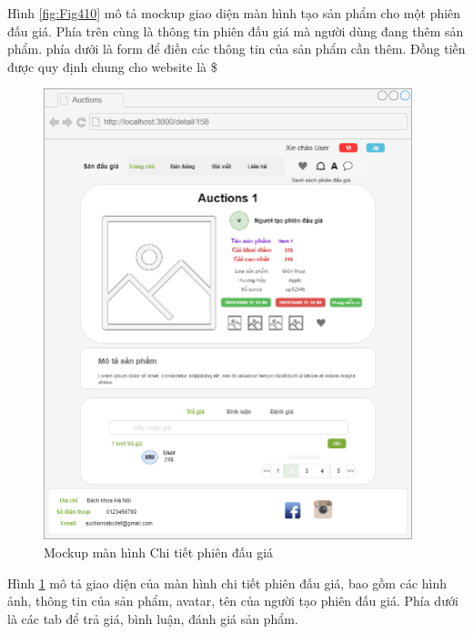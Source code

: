 \documentclass[../DoAn.tex]{subfiles}
\begin{document}
Hình \ref{fig:Fig410} mô tả mockup giao diện màn hình tạo sản phẩm cho một phiên đấu giá. Phía trên cùng là thông tin phiên đấu giá mà người dùng đang thêm sản phẩm. phía dưới là form để điền các thông tin của sản phẩm cần thêm. Đồng tiền được quy định chung cho website là \$
\newpage
\begin{figure}[H]
    \centering
    \includegraphics[width=0.75\linewidth,height=13.1cm]{Hinhve/detailitem.png}
    \caption{Mockup màn hình Chi tiết phiên đấu giá}
    \label{fig:Fig411}
\end{figure}
Hình \ref{fig:Fig411} mô tả giao diện của màn hình chi tiết phiên đấu giá, bao gồm các hình ảnh, thông tin của sản phẩm, avatar, tên của người tạo phiên đấu giá. Phía dưới là các tab để trả giá, bình luận, đánh giá sản phẩm. 
\newpage
\end{document}
